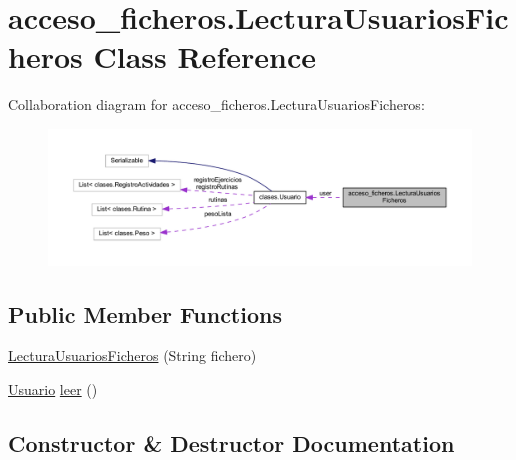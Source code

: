 \hypertarget{classacceso__ficheros_1_1_lectura_usuarios_ficheros}{}\section{acceso\+\_\+ficheros.\+Lectura\+Usuarios\+Ficheros Class Reference}
\label{classacceso__ficheros_1_1_lectura_usuarios_ficheros}


Collaboration diagram for acceso\+\_\+ficheros.\+Lectura\+Usuarios\+Ficheros\+:
\nopagebreak
\begin{figure}[H]
\begin{center}
\leavevmode
\includegraphics[width=350pt]{classacceso__ficheros_1_1_lectura_usuarios_ficheros__coll__graph}
\end{center}
\end{figure}
\subsection*{Public Member Functions}
\begin{DoxyCompactItemize}
\item 
\mbox{\hyperlink{classacceso__ficheros_1_1_lectura_usuarios_ficheros_aaaee9a2f0916bab58093ebe3241f1244}{Lectura\+Usuarios\+Ficheros}} (String fichero)
\item 
\mbox{\hyperlink{classclases_1_1_usuario}{Usuario}} \mbox{\hyperlink{classacceso__ficheros_1_1_lectura_usuarios_ficheros_abfbad1424c327ef59fdfc5f9d9b80d3a}{leer}} ()
\end{DoxyCompactItemize}


\subsection{Constructor \& Destructor Documentation}
\mbox{\label{classacceso__ficheros_1_1_lectura_usuarios_ficheros_aaaee9a2f0916bab58093ebe3241f1244}} 
